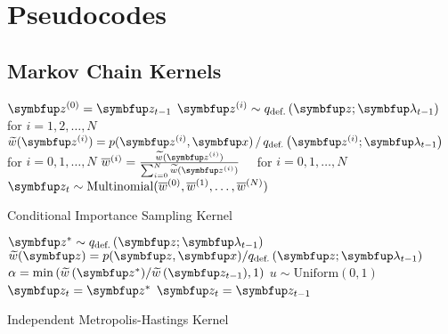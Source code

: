 
\section{Pseudocodes}\label{section:pseudocode}
\subsection{Markov Chain Kernels}

  \begin{center}
\begin{minipage}[c]{0.63\textwidth}
  \begin{algorithm2e}[H]
    \DontPrintSemicolon
    \SetAlgoLined
    \(\vz^{(0)} = \vz_{t-1}\) \;
    \(\vz^{(i)} \sim q_{\text{def.}}\left(\vz;\vlambda_{t-1}\right)\quad\) for \(i = 1, 2,\ldots, N\) \;
    \(\widetilde{w}(\vz^{(i)}) = p(\vz^{(i)},\vx) \,/\, q_{\text{def.}}\left(\vz^{(i)}; \vlambda_{t-1}\right)\quad\) for \(i = 0, 1,\ldots, N\)\;
    \(\overline{w}^{(i)} = \frac{\widetilde{w}(\vz^{(i)})}{ \sum^{N}_{i=0} \widetilde{w}(\vz^{(i)}) }\quad\) for \(i = 0, 1,\ldots, N\)\;
    \(\vz_{t} \sim \mathrm{Multinomial}(\overline{w}^{(0)}, \overline{w}^{(1)}, \ldots, \overline{w}^{(N)}) \)\;
    \caption{Conditional Importance Sampling Kernel}
  \end{algorithm2e}
\end{minipage}
  \end{center}

  \begin{center}
\begin{minipage}[c]{0.62\textwidth}
  \begin{algorithm2e}[H]
    \DontPrintSemicolon
    \SetAlgoLined
    \(\vz^* \sim q_{\text{def.}}\left(\vz; \vlambda_{t-1}\right)\)\;
    \(\widetilde{w}(\vz) = p(\vz,\vx)/q_{\text{def.}}\left(\vz; \vlambda_{t-1}\right) \)\;
    \(\alpha = \min\left( \widetilde{w}\,(\vz^*)/\widetilde{w}\,(\vz_{t-1}), 1\right)\)\;
    \(u \sim \mathrm{Uniform}(0, 1) \)\;
        {
          \(\vz_t = \vz^*\)
        }
        {
          \(\vz_t = \vz_{t-1}\)
        }
        \caption{Independent Metropolis-Hastings Kernel}
  \end{algorithm2e}
\end{minipage}
  \end{center}


